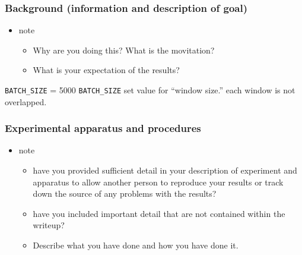 \documentclass[11pt]{article}
\begin{document}
\subsubsection{Background (information and description of goal)}
\label{sec:orge11f986}
\begin{itemize}
\item note
\begin{itemize}
\item Why are you doing this? What is the movitation?
\item What is your expectation of the results?
\end{itemize}
\end{itemize}


\texttt{BATCH\_SIZE} = 5000
\texttt{BATCH\_SIZE} set value for ``window size.''
each window is not overlapped.

\subsubsection{Experimental apparatus and procedures}
\label{sec:orgd8e47e4}
\begin{itemize}
\item note
\begin{itemize}
\item have you provided sufficient detail in your description of experiment and apparatus to allow another person to reproduce your results or track down the source of any problems with the results?
\item have you included important detail that are not contained within the writeup?
\item Describe what you have done and how you have done it.
\end{itemize}
\end{itemize}
\end{document}
